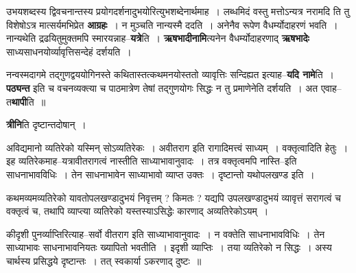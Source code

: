 \documentclass[article,12pt,a4paper]{memoir}
\begin{document}
	  \endgroup
	
	  \endgroup
	

	  \pstart उभयशब्दस्य द्विवचनान्तस्य प्रयोगदर्शनादुभयोरित्युभशब्देनार्थमाह । लब्धमिदं वस्तु मत्तोऽन्यत्र नरामदि ति तु विशेषोऽत्र मात्सर्यमभिप्रेत \textbf{आग्रहः} । न मुञ्चति नान्यस्मै ददति । अनेनैव रूपेण वैधर्म्योदाहरणं भवति । नान्यथेति द्रढयितुमुक्तमपि स्मारयन्नाह--\textbf{यत्रे}ति । \textbf{ऋषभादीनामि}त्यनेन वैधर्म्योदाहरणाद् \textbf{ऋषभादेः} साध्यसाधनयोर्व्यावृत्तिसन्देहं दर्शयति ।
	\pend
      

	  \pstart नन्वस्मदागमे तद्गुणद्वययोगिनस्ते कथितास्तत्कथमनयोस्ततो व्यावृत्तिः सन्दिह्यत इत्याह--\textbf{यदि नामे}ति । \textbf{पठ्यन्त} इति च वचनव्यक्त्या च पाठमात्रेण तेषां तद्गुणयोगः सिद्धः न तु प्रमाणेनेति दर्शयति । अत एवाह--त\textbf{थापी}ति ॥
	\pend
      

	  \pstart \textbf{त्रीनि}ति दृष्टान्तदोषान् ।
	\pend
	  \bigskip
	  \begingroup
	

	  \pstart अविद्यमानो व्यतिरेको यस्मिन् सोऽव्यतिरेकः । अवीतराग इति रागादिमत्त्वं साध्यम् । वक्तृत्वादिति हेतुः । इह व्यतिरेकमाह--यत्रावीतरागत्वं नास्तीति साध्याभावानुवादः । तत्र वक्तृत्वमपि नास्ति--इति साधनाभावविधिः । तेन साधनाभावेन साध्याभावो व्याप्त उक्तः । दृष्टान्तो यथोपलखण्ड इति ।
	\pend
        

	  \pstart कथमव्यमव्यतिरेको यावतोपलखण्डादुभयं निवृत्तम् ? किमतः ? यद्यपि उपलखण्डादुभयं व्यावृत्तं सरागत्वं च वक्तृत्वं च, तथापि व्याप्त्या व्यतिरेको यस्तस्याऽसिद्धेः कारणाद् अव्यतिरेकोऽयम् ।
	\pend
        

	  \pstart कीदृशी पुनर्व्याप्तिरित्याह--सर्वो वीतराग इति साध्याभावानुवादः । न वक्तेति साधनाभावविधिः । तेन साध्याभावः साधनाभावनियतः ख्यापितो भवतीति । इदृशी व्याप्तिः । तया व्यतिरेको न सिद्धः । अस्य चार्थस्य प्रसिद्धये दृष्टान्तः । तत् स्वकार्या ऽकरणाद् दुष्टः ॥
	\pend
        
\end{document}
